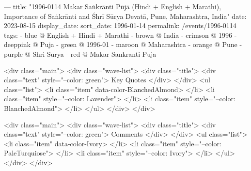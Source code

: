 ---
title: "1996-0114 Makar Saṅkrānti Pūjā (Hindi + English + Marathi), Importance of Saṅkrānti and Śhrī Sūrya Devatā, Pune, Maharashtra, India"
date: 2023-08-15
display_date: 
sort_date: 1996-01-14
permalink: /events/1996-0114
tags:
  - blue @ English + Hindi + Marathi
  - brown @ India
  - crimson @ 1996
  - deeppink @ Puja
  - green @ 1996-01
  - maroon @ Maharashtra
  - orange @ Pune
  - purple @ Shri Surya 
  - red @ Makar Sankranti Puja
---

<div class="main">
  <div class="wave-list">
    <div class="title">
      <div class="text" style="--color: green">
        Key Quotes
      </div>
    </div>
    <ul class="list">
        <li class="item" data-color-BlanchedAlmond>
        </li>
        <li class="item" style="--color: Lavender">
        </li>
        <li class="item" style="--color: BlanchedAlmond">
        </li>
      </ul>
  </div>
</div>

<div class="main">
  <div class="wave-list">
    <div class="title">
      <div class="text" style="--color: green">
        Comments
      </div>
    </div>
    <ul class="list">
        <li class="item" data-color-Ivory>
        </li>
        <li class="item" style="--color: PaleTurquiose">
        </li>
        <li class="item" style="--color: Ivory">
        </li>
      </ul>
  </div>
</div>